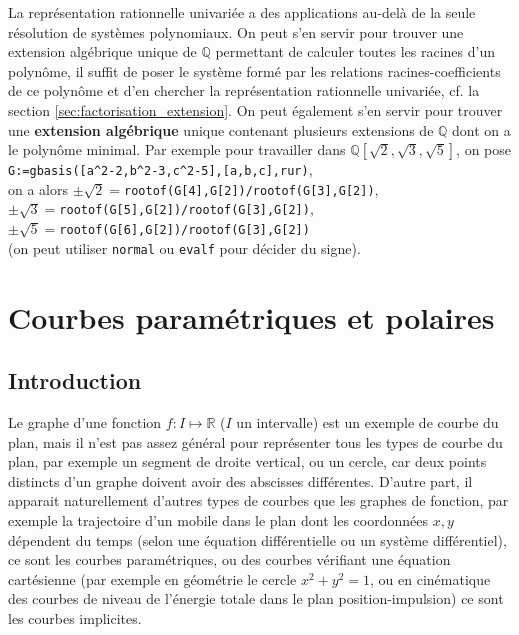 \documentclass[a4paper,11pt]{book}
\begin{document}
\begin{giacjshere}
La repr\'esentation rationnelle univari\'ee a des applications
au-del\`a de la seule r\'esolution de syst\`emes polynomiaux.
On peut s'en servir pour trouver une extension alg\'ebrique unique de
$\mathbb{Q}$ permettant de calculer toutes les racines d'un polyn\^ome, 
il suffit de poser le syst\`eme form\'e par les relations
racines-coefficients de ce polyn\^ome et d'en chercher la
repr\'esentation rationnelle univari\'ee, cf. la section 
\ref{sec:factorisation_extension}.
On peut \'egalement s'en servir pour trouver une 
{\bf extension
alg\'ebrique} 
unique contenant plusieurs extensions de $\mathbb{Q}$
dont on a le polyn\^ome minimal. Par exemple pour
travailler dans $\mathbb{Q}[\sqrt{2},\sqrt{3},\sqrt{5}]$, on pose \\
\verb|G:=gbasis([a^2-2,b^2-3,c^2-5],[a,b,c],rur)|,\\
on a alors $\pm \sqrt{2}=$\verb|rootof(G[4],G[2])/rootof(G[3],G[2])|,\\
$\pm \sqrt{3}=$\verb|rootof(G[5],G[2])/rootof(G[3],G[2])|,\\
$\pm \sqrt{5}=$\verb|rootof(G[6],G[2])/rootof(G[3],G[2])|\\
(on peut utiliser \verb|normal| ou \verb|evalf| pour d\'ecider du signe).

\chapter{Courbes param\'etriques et polaires} \label{sec:courbes}

\section{Introduction}
Le graphe d'une fonction $f: I \mapsto \mathbb{R}$ ($I$ un intervalle)
est un exemple de courbe du plan, mais il
n'est pas assez g\'en\'eral pour repr\'esenter tous les types de
courbe du plan, par exemple un segment de droite vertical, ou
un cercle, car deux points distincts d'un graphe doivent avoir
des abscisses diff\'erentes. D'autre part, il apparait naturellement
d'autres types de courbes que les graphes de fonction, par exemple
la trajectoire d'un mobile dans le plan dont les coordonn\'ees $x,y$
d\'ependent du temps (selon une \'equation diff\'erentielle ou
un syst\`eme diff\'erentiel), ce sont les courbes param\'etriques,
ou des courbes v\'erifiant une
\'equation cart\'esienne (par exemple en g\'eom\'etrie
le cercle $x^2+y^2=1$, ou en cin\'ematique des courbes
de niveau de l'\'energie totale dans le plan position-impulsion)
ce sont les courbes implicites.


\end{giacjshere}
\end{document}
